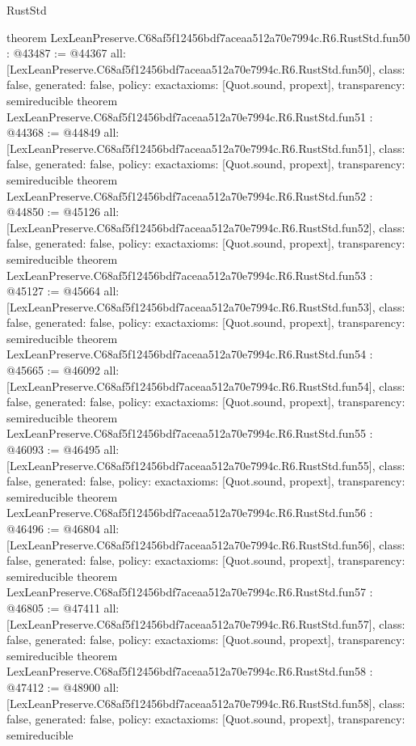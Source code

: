 \begin{lexlean}{RustStd}
\begin{coremodule}
{}
theorem LexLeanPreserve.C68af5f12456bdf7aceaa512a70e7994c.R6.RustStd.fun50 : @43487 := @44367 {
  all: [LexLeanPreserve.C68af5f12456bdf7aceaa512a70e7994c.R6.RustStd.fun50],
  class: false,
  generated: false,
  policy: exact{axioms: [Quot.sound, propext]},
  transparency: semireducible
}
theorem LexLeanPreserve.C68af5f12456bdf7aceaa512a70e7994c.R6.RustStd.fun51 : @44368 := @44849 {
  all: [LexLeanPreserve.C68af5f12456bdf7aceaa512a70e7994c.R6.RustStd.fun51],
  class: false,
  generated: false,
  policy: exact{axioms: [Quot.sound, propext]},
  transparency: semireducible
}
theorem LexLeanPreserve.C68af5f12456bdf7aceaa512a70e7994c.R6.RustStd.fun52 : @44850 := @45126 {
  all: [LexLeanPreserve.C68af5f12456bdf7aceaa512a70e7994c.R6.RustStd.fun52],
  class: false,
  generated: false,
  policy: exact{axioms: [Quot.sound, propext]},
  transparency: semireducible
}
theorem LexLeanPreserve.C68af5f12456bdf7aceaa512a70e7994c.R6.RustStd.fun53 : @45127 := @45664 {
  all: [LexLeanPreserve.C68af5f12456bdf7aceaa512a70e7994c.R6.RustStd.fun53],
  class: false,
  generated: false,
  policy: exact{axioms: [Quot.sound, propext]},
  transparency: semireducible
}
theorem LexLeanPreserve.C68af5f12456bdf7aceaa512a70e7994c.R6.RustStd.fun54 : @45665 := @46092 {
  all: [LexLeanPreserve.C68af5f12456bdf7aceaa512a70e7994c.R6.RustStd.fun54],
  class: false,
  generated: false,
  policy: exact{axioms: [Quot.sound, propext]},
  transparency: semireducible
}
theorem LexLeanPreserve.C68af5f12456bdf7aceaa512a70e7994c.R6.RustStd.fun55 : @46093 := @46495 {
  all: [LexLeanPreserve.C68af5f12456bdf7aceaa512a70e7994c.R6.RustStd.fun55],
  class: false,
  generated: false,
  policy: exact{axioms: [Quot.sound, propext]},
  transparency: semireducible
}
theorem LexLeanPreserve.C68af5f12456bdf7aceaa512a70e7994c.R6.RustStd.fun56 : @46496 := @46804 {
  all: [LexLeanPreserve.C68af5f12456bdf7aceaa512a70e7994c.R6.RustStd.fun56],
  class: false,
  generated: false,
  policy: exact{axioms: [Quot.sound, propext]},
  transparency: semireducible
}
theorem LexLeanPreserve.C68af5f12456bdf7aceaa512a70e7994c.R6.RustStd.fun57 : @46805 := @47411 {
  all: [LexLeanPreserve.C68af5f12456bdf7aceaa512a70e7994c.R6.RustStd.fun57],
  class: false,
  generated: false,
  policy: exact{axioms: [Quot.sound, propext]},
  transparency: semireducible
}
theorem LexLeanPreserve.C68af5f12456bdf7aceaa512a70e7994c.R6.RustStd.fun58 : @47412 := @48900 {
  all: [LexLeanPreserve.C68af5f12456bdf7aceaa512a70e7994c.R6.RustStd.fun58],
  class: false,
  generated: false,
  policy: exact{axioms: [Quot.sound, propext]},
  transparency: semireducible
}
\end{coremodule}
\end{lexlean}
